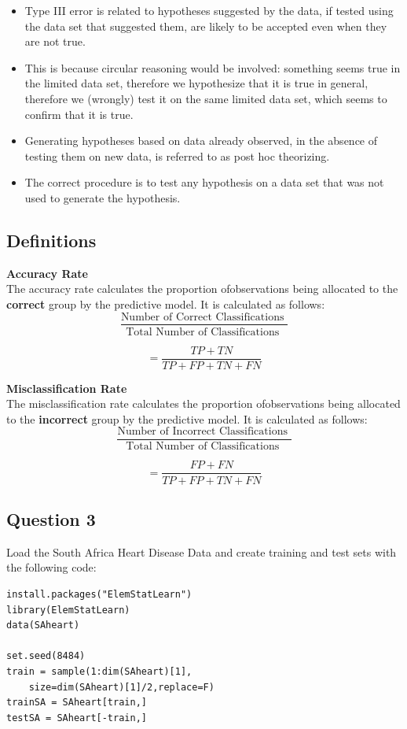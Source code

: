 \documentclass[caret-main.tex]{subfiles}
\begin{document}
\begin{itemize}
\item Type III error is related to hypotheses suggested by the data, if tested using the data set that suggested them, are likely to be accepted even when they are not true. 

\item This is because circular reasoning would be involved: something seems true in the limited data set, therefore we hypothesize that it is true in general, therefore we (wrongly) test it on the same limited data set, which seems to confirm that it is true. 

\item Generating hypotheses based on data already observed, in the absence of testing them on new data, is referred to as post hoc theorizing.


\item The correct procedure is to test any hypothesis on a data set that was not used to generate the hypothesis.
\end{itemize}
\subsection*{Definitions}
\textbf{Accuracy Rate}\\
The accuracy rate calculates the proportion ofobservations being allocated to the \textbf{correct} group by the predictive model. It is calculated as follows:
\[ \frac{
\mbox{Number of Correct Classifications }}{\mbox{Total Number of Classifications }} \]

\[ = \frac{TP + TN}{TP+FP+TN+FN}\]


\noindent \textbf{Misclassification Rate}\\
The misclassification rate calculates the proportion ofobservations being allocated to the \textbf{incorrect} group by the predictive model. It is calculated as follows:
\[ \frac{
\mbox{Number of Incorrect Classifications }}{\mbox{Total Number of Classifications }} \]

\[ = \frac{FP + FN}{TP+FP+TN+FN}\]

\newpage
\subsection*{Question 3}


Load the South Africa Heart Disease Data and create training and test sets with
the following code:
\begin{framed}
\begin{verbatim}
install.packages("ElemStatLearn")
library(ElemStatLearn)
data(SAheart)

set.seed(8484)
train = sample(1:dim(SAheart)[1],
    size=dim(SAheart)[1]/2,replace=F)
trainSA = SAheart[train,]
testSA = SAheart[-train,]

\end{verbatim}
\end{framed}
\end{document}
